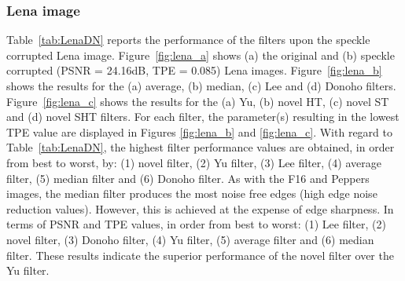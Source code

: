 \documentclass[12pt]{report}
\begin{document}
\subsubsection{Lena image}
Table~\ref{tab:LenaDN} reports the performance of the filters upon the speckle corrupted Lena image.
Figure~\ref{fig:lena_a} shows (a) the original and (b) speckle corrupted (PSNR = 24.16dB, TPE = 0.085) Lena images.
Figure~\ref{fig:lena_b} shows the results for the (a) average, (b) median, (c) Lee and (d) Donoho filters. 
Figure~\ref{fig:lena_c} shows the results for the (a) Yu, (b) novel HT, (c) novel ST and (d) novel SHT filters.
For each filter, the parameter(s) resulting in the lowest TPE value are displayed in Figures \ref{fig:lena_b} and \ref{fig:lena_c}.
With regard to Table~\ref{tab:LenaDN}, the highest filter performance values are obtained, in order from best to worst, by:
(1) novel filter, (2) Yu filter, (3) Lee filter, (4) average filter, (5) median filter and (6) Donoho filter.
As with the F16 and Peppers images, the median filter produces the most noise free edges (high edge noise reduction values).
However, this is achieved at the expense of edge sharpness. In terms of PSNR and TPE values, in order from best to worst:
(1) Lee filter, (2) novel filter, (3) Donoho filter, (4) Yu filter, (5) average filter and (6) median filter.
These results indicate the superior performance of the novel filter over the Yu filter. 
\end{document}
